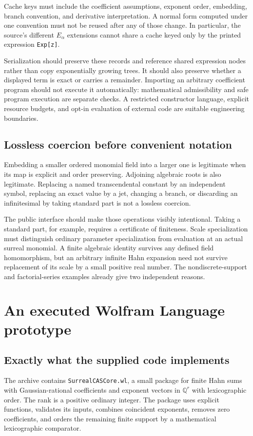 \documentclass[11pt,letterpaper]{article}
\numberwithin{equation}{section}
\theoremstyle{definition}
\theoremstyle{remark}\newtheorem{remark}[theorem]{Remark}
\newcommand{\Q}{\mathbb Q}
\begin{document}
Cache keys must include the coefficient assumptions, exponent order,
embedding, branch convention, and derivative interpretation. A normal form
computed under one convention must not be reused after any of those change.
In particular, the source's different $E_\alpha$ extensions cannot share a
cache keyed only by the printed expression \texttt{Exp[z]}.

Serialization should preserve these records and reference shared expression
nodes rather than copy exponentially growing trees. It should also preserve
whether a displayed term is exact or carries a remainder. Importing an
arbitrary coefficient program should not execute it automatically: mathematical
admissibility and safe program execution are separate checks. A restricted
constructor language, explicit resource budgets, and opt-in evaluation of
external code are suitable engineering boundaries.

\subsection{Lossless coercion before convenient notation}
Embedding a smaller ordered monomial field into a larger one is legitimate
when its map is explicit and order preserving. Adjoining algebraic roots is
also legitimate. Replacing a named transcendental constant by an independent
symbol, replacing an exact value by a jet, changing a branch, or discarding
an infinitesimal by taking standard part is not a lossless coercion.

The public interface should make those operations visibly intentional.
Taking a standard part, for example, requires a certificate of finiteness.
Scale specialization must distinguish ordinary parameter specialization from
evaluation at an actual surreal monomial. A finite algebraic identity
survives any defined field homomorphism, but an arbitrary infinite Hahn
expansion need not survive replacement of its scale by a small positive real
number. The nondiscrete-support and factorial-series examples already give
two independent reasons.

\section{An executed Wolfram Language prototype}
\label{sec:prototype}

\subsection{Exactly what the supplied code implements}
The archive contains \texttt{SurrealCASCore.wl}, a small package for finite
Hahn sums with Gaussian-rational coefficients and exponent vectors in
$\Q^r$ with lexicographic order. The rank is a positive ordinary integer.
The package uses explicit functions, validates its inputs, combines coincident
exponents, removes zero coefficients, and orders the remaining finite support
by a mathematical lexicographic comparator.
\end{document}
